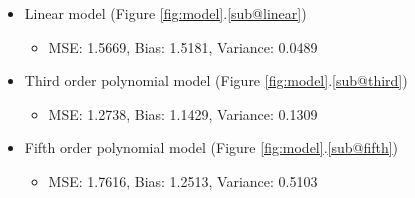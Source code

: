 \documentclass{article}
\begin{document}
\begin{enumerate}
    \begin{itemize}
        \item Linear model (Figure \ref{fig:model}.\ref{sub@linear})
        \begin{itemize}
            \item MSE: 1.5669, Bias: 1.5181, Variance: 0.0489
        \end{itemize}
        \item Third order polynomial model (Figure \ref{fig:model}.\ref{sub@third})
        \begin{itemize}
            \item MSE: 1.2738, Bias: 1.1429, Variance: 0.1309
        \end{itemize}
        \item Fifth order polynomial model (Figure \ref{fig:model}.\ref{sub@fifth})
        \begin{itemize}
            \item MSE: 1.7616, Bias: 1.2513, Variance: 0.5103
        \end{itemize}
    \end{itemize}
    

\end{enumerate}
\end{document}
